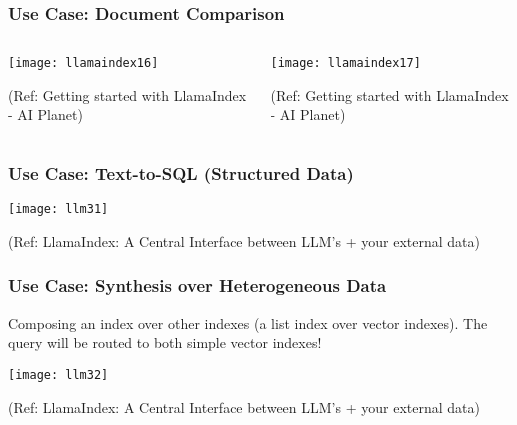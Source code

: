 \begin{frame}[fragile]\frametitle{Use Case: Document Comparison}

\begin{columns}
    \begin{column}[T]{0.45\linewidth}

		\begin{center}
		\texttt{[image: llamaindex16]}

		{\tiny (Ref: Getting started with LlamaIndex - AI Planet)}
		\end{center}
		
    \end{column}
    \begin{column}[T]{0.45\linewidth}
		\begin{center}
		\texttt{[image: llamaindex17]}

		{\tiny (Ref: Getting started with LlamaIndex - AI Planet)}
		\end{center}
    \end{column}
  \end{columns}
  
  


\end{frame}



\begin{frame}[fragile]\frametitle{Use Case: Text-to-SQL (Structured Data)}

\begin{center}
\texttt{[image: llm31]}

{\tiny (Ref: LlamaIndex: A Central Interface between LLM’s + your external data)}
\end{center}
\end{frame}

\begin{frame}[fragile]\frametitle{Use Case: Synthesis over Heterogeneous Data}

Composing an index over other indexes (a list index over vector indexes). 
The query will be routed to both simple vector indexes! 


\begin{center}
\texttt{[image: llm32]}

{\tiny (Ref: LlamaIndex: A Central Interface between LLM’s + your external data)}
\end{center}
\end{frame}

